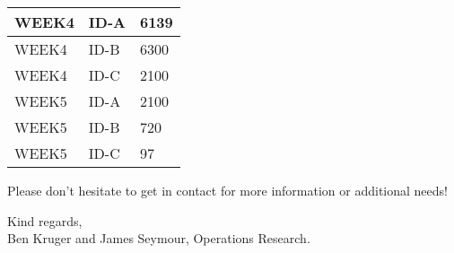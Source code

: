 \documentclass[12pt]{article}
\begin{document}
{\begin{center}
\begin{table}[H]
\begin{tabular}{|l|l|l|}
            WEEK4                               & ID-A                             & 6139                                                \\ \hline
            WEEK4                               & ID-B                             & 6300                                                \\ \hline
            WEEK4                               & ID-C                             & 2100                                                \\ \hline
            WEEK5                               & ID-A                             & 2100                                                \\ \hline
            WEEK5                               & ID-B                             & 720                                                 \\ \hline
            WEEK5                               & ID-C                             & 97                                                  \\ \hline
            \end{tabular}
            \end{table}
    \end{center}




    Please don't hesitate to get in contact for more information or additional needs!
    
    Kind regards,\\
    Ben Kruger and James Seymour, Operations Research.\\


    }
    
        
\end{document}
